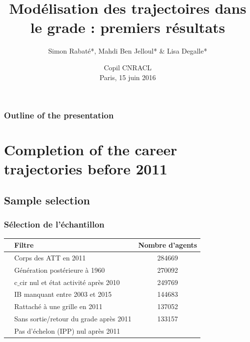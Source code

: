 \documentclass[xcolor=table,ignorenonframetext,12pt]{beamer}
\title{Modélisation des trajectoires dans le grade : premiers résultats}
\author{Simon Rabaté*, Mahdi Ben Jelloul* \& Lisa Degalle*}
\institute{
  \inst{*} IPP
}
\date{Copil CNRACL\\
	Paris, 15 juin 2016}
\begin{document}
\frame{\maketitle}


\begin{frame}
    \frametitle{Outline of the presentation}
    \tableofcontents[hidesubsections]
\end{frame}





\section{Completion of the career trajectories before 2011}


\subsection{Sample selection}
\begin{frame}
\frametitle{Sélection de l'échantillon}
\begin{table}
\begin{tabular}{llc}
\toprule
& 		 						 Filtre &  Nombre d'agents\\
\midrule
&     	          Corps des ATT en 2011 &  284669 \\
&     	  Génération postérieure à 1960 &  270092 \\
& c${\_}$cir nul et état activité après 2010 &  249769 \\
&        IB manquant entre 2003 et 2015 &  144683 \\
&         Rattaché à une grille en 2011 &  137052 \\
&Sans sortie/retour du grade après 2011 &  133157 \\
& 		 	 Pas d'échelon (IPP) nul après 2011 &  \boxed{105110} \\
\bottomrule
\end{tabular}
\end{table}

\end{frame}
\end{document}
